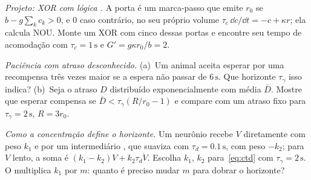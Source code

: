 \begin{exercise}[\lvlB]
\label{ex:05:6}
\emph{Projeto: XOR com lógica .} A porta é um marca-passo que emite $r_0$ se $b-g\sum_kc_k>0$, e $0$ caso contrário, no seu próprio volume $\tau_c\,\dd c/\dd t=-c+\kappa r$; ela calcula NOU. Monte um XOR com cinco dessas portas e encontre seu tempo de acomodação com $\tau_c=1\,\text{s}$ e $G'=g\kappa r_0/b=2$.
\end{exercise}

\begin{exercise}[\lvlB]
\label{ex:05:7}
\emph{Paciência com atraso desconhecido.} (a)~Um animal aceita esperar por uma recompensa três vezes maior se a espera não passar de $6\,\text{s}$. Que horizonte $\tau_\gamma$ isso indica? (b)~Seja o atraso $D$ distribuído exponencialmente com média $\bar D$. Mostre que esperar compensa se $\bar D<\tau_\gamma(R/r_0-1)$ e compare com um atraso fixo para $\tau_\gamma=2\,\text{s}$, $R=3r_0$.
\end{exercise}

\begin{exercise}[\lvlC]
\label{ex:05:8}
\emph{Como a concentração define o horizonte.} Um neurônio  recebe $V$ diretamente com peso $k_1$ e por um intermediário , que suaviza com $\tau_d=0.1\,\text{s}$, com peso $-k_2$; para $V$ lento, a soma é $(k_1-k_2)V+k_2\tau_d\dot V$. Escolha $k_1$, $k_2$ para~\eqref{eq:ctd} com $\tau_\gamma=2\,\text{s}$. O  multiplica $k_1$ por $m$: quanto é preciso mudar $m$ para dobrar o horizonte?
\end{exercise}
